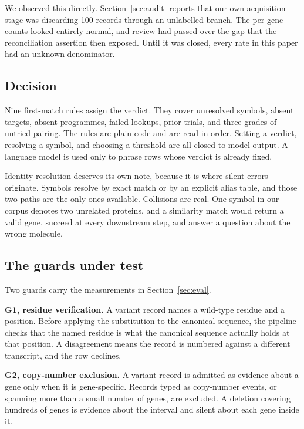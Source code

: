 We observed this directly. Section~\ref{sec:audit} reports that our own
acquisition stage was discarding 100 records through an unlabelled branch. The
per-gene counts looked entirely normal, and review had passed over the gap
that the reconciliation assertion then exposed. Until it was closed, every
rate in this paper had an unknown denominator.

\subsection{Decision}

Nine first-match rules assign the verdict. They cover unresolved symbols,
absent targets, absent programmes, failed lookups, prior trials, and three
grades of untried pairing. The rules are plain code and are read in order.
Setting a verdict, resolving a symbol, and choosing a threshold are all closed
to model output. A language model is used only to phrase rows whose verdict is
already fixed.

Identity resolution deserves its own note, because it is where silent errors
originate. Symbols resolve by exact match or by an explicit alias table, and
those two paths are the only ones available. Collisions are real. One symbol
in our corpus denotes two unrelated proteins, and a similarity match would
return a valid gene, succeed at every downstream step, and answer a question
about the wrong molecule.

\subsection{The guards under test}
\label{sec:guards}

Two guards carry the measurements in Section~\ref{sec:eval}.

\textbf{G1, residue verification.} A variant record names a wild-type residue
and a position. Before applying the substitution to the canonical sequence,
the pipeline checks that the named residue is what the canonical sequence
actually holds at that position. A disagreement means the record is numbered
against a different transcript, and the row declines.

\textbf{G2, copy-number exclusion.} A variant record is admitted as evidence
about a gene only when it is gene-specific. Records typed as copy-number
events, or spanning more than a small number of genes, are excluded. A
deletion covering hundreds of genes is evidence about the interval and silent
about each gene inside it.
